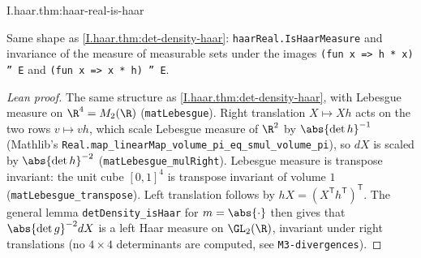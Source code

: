 \begin{theorem}
\end{theorem}
\begin{tfformal}{I.haar.thm:haar-real-is-haar}
\begin{tffidelity}
Same shape as \cref{I.haar.thm:det-density-haar}: \texttt{haarReal.IsHaarMeasure} and invariance of the measure of measurable sets under the images \texttt{(fun x => h * x) '' E} and \texttt{(fun x => x * h) '' E}.
\end{tffidelity}
\end{tfformal}
\begin{proof}[Lean proof]
The same structure as \cref{I.haar.thm:det-density-haar}, with Lebesgue measure on $\R^4=M_2(\R)$ (\texttt{matLebesgue}). Right translation $X\mapsto Xh$ acts on the two rows $v\mapsto vh$, which scale Lebesgue measure of $\R^2$ by $\abs{\det h}^{-1}$ (Mathlib's \texttt{Real.map\_linearMap\_volume\_pi\_eq\_smul\_volume\_pi}), so $dX$ is scaled by $\abs{\det h}^{-2}$ (\texttt{matLebesgue\_mulRight}). Lebesgue measure is transpose invariant: the unit cube $[0,1]^4$ is transpose invariant of volume $1$ (\texttt{matLebesgue\_transpose}). Left translation follows by $hX=(X^{\mathsf T}h^{\mathsf T})^{\mathsf T}$. The general lemma \texttt{detDensity\_isHaar} for $m=\abs{\cdot}$ then gives that $\abs{\det g}^{-2}dX$ is a left Haar measure on $\GL_2(\R)$, invariant under right translations (no $4\times4$ determinants are computed, see \texttt{M3-divergences}).
\end{proof}

